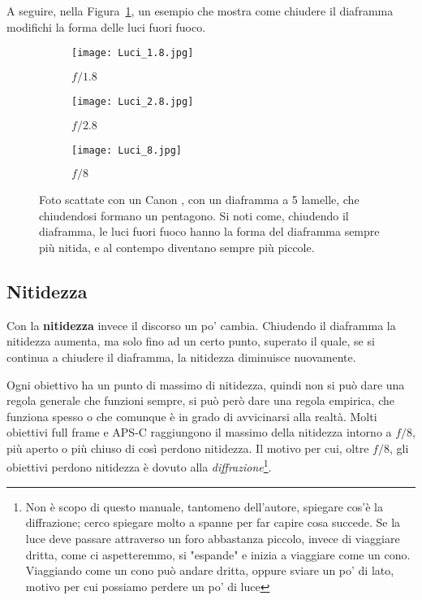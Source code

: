 A seguire, nella Figura~\ref{fig:diaframmaluci}, un esempio che mostra come chiudere il diaframma modifichi la forma delle luci fuori fuoco.

\begin{figure}[H]
    \centering
        \begin{subfigure}{0.33\linewidth}
            \texttt{[image: Luci\_1.8.jpg]}
            \caption{$f/1.8$}
        \end{subfigure}
        \begin{subfigure}{0.33\linewidth}
            \texttt{[image: Luci\_2.8.jpg]}
            \caption{$f/2.8$}
        \end{subfigure}
    
        \begin{subfigure}{0.33\linewidth}
            \texttt{[image: Luci\_8.jpg]}
            \caption{$f/8$}
        \end{subfigure}

    \caption{Foto scattate con un Canon , con un diaframma a 5 lamelle, che chiudendosi formano un pentagono. Si noti come, chiudendo il diaframma, le luci fuori fuoco hanno la forma del diaframma sempre più nitida, e al contempo diventano sempre più piccole.}
    \label{fig:diaframmaluci}
\end{figure}

\subsection{Nitidezza} \label{subsec:diaframmanitidezza}
Con la \textbf{nitidezza} invece il discorso un po' cambia. Chiudendo il diaframma la nitidezza aumenta, ma solo fino ad un certo punto, superato il quale, se si continua a chiudere il diaframma, la nitidezza diminuisce nuovamente.

Ogni obiettivo ha un punto di massimo di nitidezza, quindi non si può dare una regola generale che funzioni sempre, si può però dare una regola empirica, che funziona spesso o che comunque è in grado di avvicinarsi alla realtà.
Molti obiettivi full frame e APS-C raggiungono il massimo della nitidezza intorno a $f/8$, più aperto o più chiuso di così perdono nitidezza.
Il motivo per cui, oltre $f/8$, gli obiettivi perdono nitidezza è dovuto alla \textit{diffrazione}\footnote{Non è scopo di questo manuale, tantomeno dell'autore, spiegare cos'è la diffrazione; cerco spiegare molto a spanne per far capire cosa succede. Se la luce deve passare attraverso un foro abbastanza piccolo, invece di viaggiare dritta, come ci aspetteremmo, si "espande" e inizia a viaggiare come un cono. Viaggiando come un cono può andare dritta, oppure sviare un po' di lato, motivo per cui possiamo perdere un po' di luce}.

